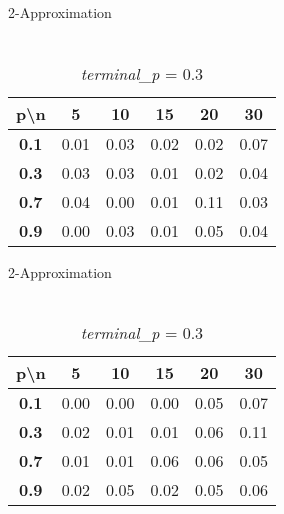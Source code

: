 \documentclass[a4paper,12pt]{article}
\begin{document}
    \begin{table}[h!]
        \begin{minipage}{0.47\textwidth}
            \centering
            \caption*{Average Time Complexity (ms)}
            {\vspace{-0.5em}2-Approximation\par\vspace{1em}}
            \begin{tabular}{c|ccccc}
                \toprule
                \textbf{p\textbackslash n} & \textbf{5} & \textbf{10} & \textbf{15} & \textbf{20} & \textbf{30} \\
                \midrule
                \textbf{0.1} & 0.01 & 0.03 & 0.02 & 0.02 & 0.07 \\
                \textbf{0.3} & 0.03 & 0.03 & 0.01 & 0.02 & 0.04 \\
                \textbf{0.7} & 0.04 & 0.00 & 0.01 & 0.11 & 0.03 \\
                \textbf{0.9} & 0.00 & 0.03 & 0.01 & 0.05 & 0.04 \\
                \bottomrule
            \end{tabular}
            \caption*{\\\textit{terminal\_p} = $0.1$}
        \end{minipage}
        \hfill
        \begin{minipage}{0.47\textwidth}
            \centering
            \caption*{Average Time Complexity (ms)}
            {\vspace{-0.5em}2-Approximation\par\vspace{1em}}
            \begin{tabular}{c|ccccc}
                \toprule
                \textbf{p\textbackslash n} & \textbf{5} & \textbf{10} & \textbf{15} & \textbf{20} & \textbf{30} \\
                \midrule
                \textbf{0.1} & 0.00 & 0.00 & 0.00 & 0.05 & 0.07 \\
                \textbf{0.3} & 0.02 & 0.01 & 0.01 & 0.06 & 0.11 \\
                \textbf{0.7} & 0.01 & 0.01 & 0.06 & 0.06 & 0.05 \\
                \textbf{0.9} & 0.02 & 0.05 & 0.02 & 0.05 & 0.06 \\
                \bottomrule
            \end{tabular}
            \caption*{\\\textit{terminal\_p} = $0.3$}
        \end{minipage}
    \end{table}
\end{document}
